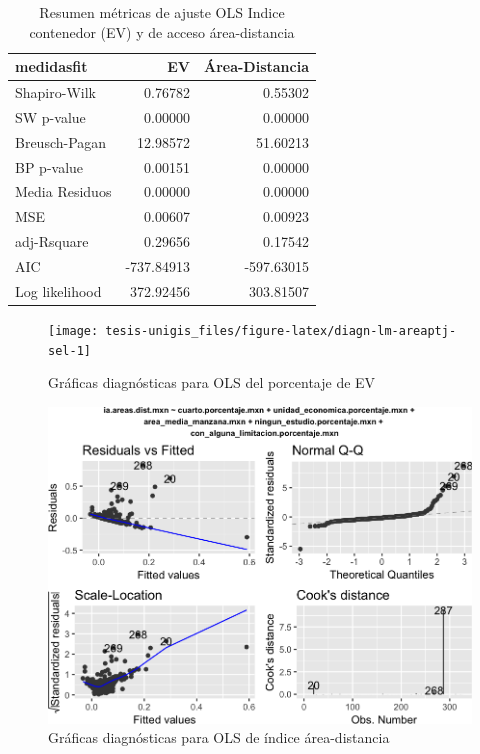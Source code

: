 \documentclass[12pt,a4paper,openany]{book}
\theoremstyle{definition}
\theoremstyle{definition}
\theoremstyle{definition}
\theoremstyle{remark}
\begin{document}
\begin{table}[H]

\caption{\label{tab:ajuste-lmev-pob-predios}Resumen métricas de ajuste OLS Indice contenedor (EV) y de acceso área-distancia }
\centering
\begin{tabular}{lrr}
\toprule
medidasfit & EV & Área-Distancia\\
\midrule
Shapiro-Wilk & 0.76782 & 0.55302\\
SW p-value & 0.00000 & 0.00000\\
Breusch-Pagan & 12.98572 & 51.60213\\
BP p-value & 0.00151 & 0.00000\\
Media Residuos & 0.00000 & 0.00000\\
\addlinespace
MSE & 0.00607 & 0.00923\\
adj-Rsquare & 0.29656 & 0.17542\\
AIC & -737.84913 & -597.63015\\
Log likelihood & 372.92456 & 303.81507\\
\bottomrule
\end{tabular}
\end{table}

\begin{figure}[H]

{\centering \texttt{[image: tesis-unigis\_files/figure-latex/diagn-lm-areaptj-sel-1]} 

}

\caption{Gráficas diagnósticas para OLS del porcentaje de EV }\label{fig:diagn-lm-areaptj-sel}
\end{figure}

\begin{figure}[H]

{\centering \includegraphics[width=1\linewidth]{tesis-unigis_files/figure-latex/diagn-lm-areadist-sel-1} 

}

\caption{Gráficas diagnósticas para OLS de índice área-distancia}\label{fig:diagn-lm-areadist-sel}
\end{figure}
\end{document}

